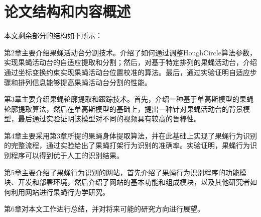 \section{论文结构和内容概述}

本文剩余部分的结构如下所示：

第2章主要介绍果蝇活动台分割技术。介绍了如何通过调整HoughCircle算法参数，实现果蝇活动台的自适应提取和分割；然后，对基于特定排列的果蝇活动台，介绍通过坐标变换约束实现果蝇活动台位置校准的算法。最后，通过实验证明自适应步骤和排列信息能够提高果蝇活动台分割的性能。

第3章主要介绍果蝇轮廓提取和跟踪技术。首先，介绍一种基于单高斯模型的果蝇轮廓提取算法，然后在单高斯模型的基础上，提出一种针对果蝇活动台的背景模型，最后通过实验证明该模型对不同的视频具有较高的鲁棒性。

第4章主要采用第3章所提的果蝇身体提取算法，并在此基础上实现了果蝇行为识别的完整流程，通过实验给出了果蝇打架行为识别的准确率。实验证明，果蝇行为识别程序可以得到优于人工的识别结果。

第5章主要介绍了果蝇行为识别的网站，首先介绍了果蝇行为识别程序的功能模块、开发和部署环境，然后介绍了网站的基本功能和组成模块，以及其他研究者如何利用网站进行果蝇行为学研究。

第6章对本文工作进行总结，并对将来可能的研究方向进行展望。


